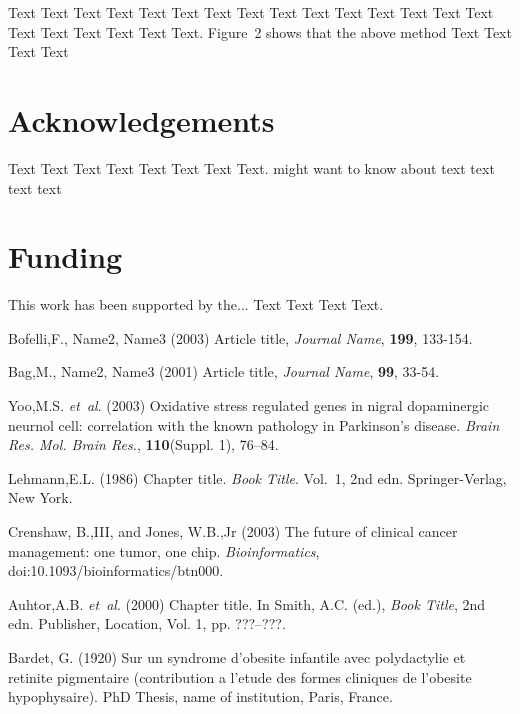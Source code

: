 \documentclass{bioinfo}
\begin{document}
    Text Text Text Text Text Text Text Text Text Text Text Text Text
    Text Text Text Text Text Text Text Text.
    Figure~2\vphantom{\ref{fig:02}} shows that the above method Text
    Text Text Text\vspace*{-10pt}


    \section*{Acknowledgements}

    Text Text Text Text Text Text Text Text.  \citealp{Boffelli03} might want to know about text
    text text text\vspace*{-12pt}

    \section*{Funding}

    This work has been supported by the... Text Text Text Text.\vspace*{-12pt}

%
%
%
%
%
%
%
%
%


    \begin{thebibliography}{}

        Bofelli,F., Name2, Name3 (2003) Article title, {\it Journal Name}, {\bf 199}, 133-154.

        Bag,M., Name2, Name3 (2001) Article title, {\it Journal Name}, {\bf 99}, 33-54.

        Yoo,M.S. \textit{et~al}. (2003) Oxidative stress regulated genes
        in nigral dopaminergic neurnol cell: correlation with the known
        pathology in Parkinson's disease. \textit{Brain Res. Mol. Brain
        Res.}, \textbf{110}(Suppl. 1), 76--84.

        Lehmann,E.L. (1986) Chapter title. \textit{Book Title}. Vol.~1, 2nd edn. Springer-Verlag, New York.

        Crenshaw, B.,III, and Jones, W.B.,Jr (2003) The future of clinical
        cancer management: one tumor, one chip. \textit{Bioinformatics},
        doi:10.1093/bioinformatics/btn000.

        Auhtor,A.B. \textit{et~al}. (2000) Chapter title. In Smith, A.C.
        (ed.), \textit{Book Title}, 2nd edn. Publisher, Location, Vol. 1, pp.
        ???--???.

        Bardet, G. (1920) Sur un syndrome d'obesite infantile avec
        polydactylie et retinite pigmentaire (contribution a l'etude des
        formes cliniques de l'obesite hypophysaire). PhD Thesis, name of
        institution, Paris, France.

    \end{thebibliography}
\end{document}
